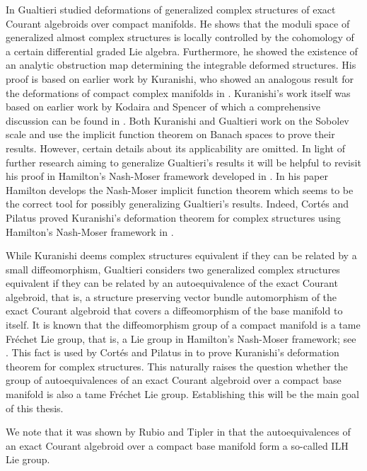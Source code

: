 \documentclass[12pt,a4paper]{article}
\theoremstyle{plain}
\theoremstyle{definition}
\begin{document}
In \cite{gualtieri} Gualtieri studied deformations of generalized complex structures of exact Courant algebroids over compact manifolds. He shows that the moduli space of generalized almost complex structures is locally controlled by the cohomology of a certain differential graded Lie algebra. Furthermore, he showed the existence of an analytic obstruction map determining the integrable deformed structures. His proof is based on earlier work by Kuranishi, who showed an analogous result for the deformations of compact complex manifolds in \cite{Kuranishi}. Kuranishi's work itself was based on earlier work by Kodaira and Spencer of which a comprehensive discussion can be found in \cite{kodaira1986complex}.
Both Kuranishi and Gualtieri work on the Sobolev scale and use the implicit function theorem on Banach spaces to prove their results. However, certain details about its applicability are omitted.
In light of further research aiming to generalize Gualtieri's results it will be helpful to revisit his proof in Hamilton's Nash-Moser framework developed in \cite{hamilton}. In his paper Hamilton develops the Nash-Moser implicit function theorem which seems to be the correct tool for possibly generalizing Gualtieri's results. Indeed, Cortés and Pilatus proved Kuranishi's deformation theorem for complex structures using Hamilton's Nash-Moser framework in \cite{cortesPilatusCxStr}.

While Kuranishi deems complex structures equivalent if they can be related by a small diffeomorphism, Gualtieri considers two generalized complex structures equivalent if they can be related by an autoequivalence of the exact Courant algebroid, that is, a structure preserving vector bundle automorphism of the exact Courant algebroid that covers a diffeomorphism of the base manifold to itself. 
It is known that the diffeomorphism group of a compact manifold is a tame Fréchet Lie group, that is, a Lie group in Hamilton's Nash-Moser framework; see \cite{hamilton}. This fact is used by Cortés and Pilatus in \cite{cortesPilatusCxStr} to prove Kuranishi's deformation theorem for complex structures. This naturally raises the question whether the group of autoequivalences of an exact Courant algebroid over a compact base manifold is also a tame Fréchet Lie group. Establishing this will be the main goal of this thesis.

We note that it was shown by Rubio and Tipler in \cite{RubioTipler} that the autoequivalences of an exact Courant algebroid over a compact base manifold form a so-called ILH Lie group.
\end{document}
